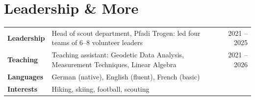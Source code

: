 \documentclass[10pt,a4paper]{article}
\newlength{\labelcolwidth}
\begin{document}
\section{Leadership \& More}
\begin{tabularx}{\linewidth}{@{}>{\bfseries}p{} >{\raggedright\arraybackslash}X r@{}}
  Leadership & Head of scout department, Pfadi Trogen: led four teams of 6--8 volunteer leaders & {\color{inksoft}2021 -- 2025} \\[0.15em]
  Teaching   & Teaching assistant: Geodetic Data Analysis, Measurement Techniques, Linear Algebra & {\color{inksoft}2021 -- 2026} \\[0.15em]
  Languages  & German (native), English (fluent), French (basic) & \\[0.15em]
  Interests  & Hiking, skiing, football, scouting & \\
\end{tabularx}
\end{document}
